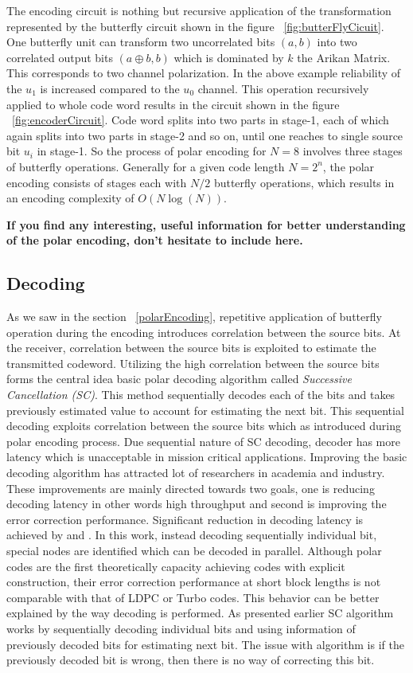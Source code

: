 The encoding circuit is nothing but recursive application of the transformation represented by the butterfly circuit shown in the figure ~\ref{fig:butterFlyCicuit}. One butterfly unit can transform two uncorrelated bits $(a,b)$ into two correlated output bits $(a\oplus b,b)$ which is dominated by $k$ the Arikan Matrix. This corresponds to two channel polarization. In the above example reliability of the $u_{1}$ is increased compared to the $u_{0}$ channel. This operation recursively applied to whole code word results in the circuit shown in the figure ~\ref{fig:encoderCircuit}. Code word splits into two parts in stage-1, each of which again splits into two parts in stage-2 and so on, until one reaches to single source bit $u_{i}$ in stage-1. So the process of polar encoding for $N = 8$ involves three stages of butterfly operations. Generally for a given code length $N=2^{n}$, the polar encoding consists of stages each with $N/2$ butterfly operations, which results in an encoding complexity of $O(N\log(N))$.


\textbf{If you find any interesting, useful information for better understanding of the polar encoding, don't hesitate to include here.} \newpage

\subsection{Decoding}
As we saw in the section ~\ref{polarEncoding}, repetitive application of butterfly operation during the encoding introduces correlation between the source bits. At the receiver, correlation between the source bits is exploited to estimate the transmitted codeword. Utilizing the high correlation between the source bits forms the central idea basic polar decoding algorithm called \emph{Successive Cancellation (SC)}. This method sequentially decodes each of the bits and takes previously estimated value to account for estimating the next bit. This sequential decoding exploits correlation between the source bits which as introduced during polar encoding process. Due sequential nature of SC decoding, decoder has more latency which is unacceptable in mission critical applications. Improving the basic decoding algorithm has attracted lot of researchers in academia and industry. These improvements are mainly directed towards two goals, one is reducing decoding latency in other words high throughput and second is improving the error correction performance. Significant reduction in decoding latency is achieved by \cite{SSC} and \cite{fastSSC}. In this work, instead decoding sequentially individual bit, special nodes are identified which can be decoded in parallel. Although polar codes are the first theoretically capacity achieving codes with explicit construction, their error correction performance at short block lengths is not comparable with that of LDPC or Turbo codes. This behavior can be better explained by the way decoding is performed. As presented earlier SC algorithm works by sequentially decoding individual bits and using information of previously decoded bits for estimating next bit. The issue with algorithm is if the previously decoded bit is wrong, then there is no way of correcting this bit.

